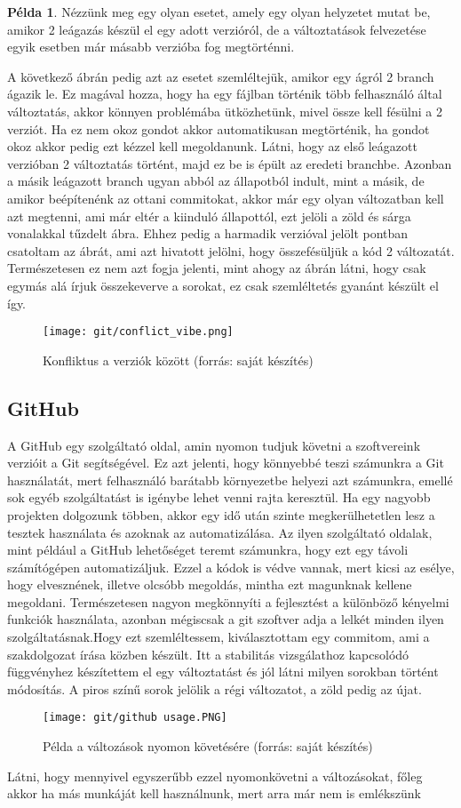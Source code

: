 \documentclass{article}
\theoremstyle{definition}
\theoremstyle{theorem}
\newtheorem{example}{Példa}
\begin{document}
\begin{example}
Nézzünk meg egy olyan esetet, amely egy olyan helyzetet mutat be, amikor 2 leágazás készül el egy adott verzióról, de a változtatások felvezetése egyik esetben már másabb verzióba fog megtörténni.
\end{example}
A következő ábrán pedig azt az esetet szemléltejük, amikor egy ágról 2 branch ágazik le. Ez magával hozza, hogy ha egy fájlban történik több felhasználó által változtatás, akkor könnyen problémába ütközhetünk, mivel össze kell fésülni a 2 verziót. Ha ez nem okoz gondot akkor automatikusan megtörténik, ha gondot okoz akkor pedig ezt kézzel kell megoldanunk. Látni, hogy az első leágazott verzióban 2 változtatás történt, majd ez be is épült az eredeti branchbe. Azonban a másik leágazott branch ugyan abból az állapotból indult, mint a másik, de amikor beépítenénk az ottani commitokat, akkor már egy olyan változatban kell azt megtenni, ami már eltér a kiinduló állapottól, ezt jelöli a zöld és sárga vonalakkal tűzdelt ábra.
Ehhez pedig a harmadik verzióval jelölt pontban csatoltam az ábrát, ami azt hivatott jelölni, hogy összefésüljük a kód 2 változatát. Természetesen ez nem azt fogja jelenti, mint ahogy az ábrán látni, hogy csak egymás alá írjuk összekeverve a sorokat, ez csak szemléltetés gyanánt készült el így.
\begin{figure}[H]
    \centering
    \texttt{[image: git/conflict\_vibe.png]}
    \caption{Konfliktus a verziók között (forrás: saját készítés)}
    \label{van_konflikt}
\end{figure}
\subsection{GitHub}
A GitHub\cite{github} egy szolgáltató oldal, amin nyomon tudjuk követni a szoftvereink verzióit a Git segítségével. Ez azt jelenti, hogy könnyebbé teszi számunkra a Git használatát, mert felhasználó barátabb környezetbe helyezi azt számunkra, emellé sok egyéb szolgáltatást is igénybe lehet venni rajta keresztül. Ha egy nagyobb projekten dolgozunk többen, akkor egy idő után szinte megkerülhetetlen lesz a tesztek használata és azoknak az automatizálása. Az ilyen szolgáltató oldalak, mint például a GitHub lehetőséget teremt számunkra, hogy ezt egy távoli számítógépen automatizáljuk. Ezzel a kódok is védve vannak, mert kicsi az esélye, hogy elvesznének, illetve olcsóbb megoldás, mintha ezt magunknak kellene megoldani. Természetesen nagyon megkönnyíti a fejlesztést a különböző kényelmi funkciók használata, azonban mégiscsak a git szoftver adja a lelkét minden ilyen szolgáltatásnak.Hogy ezt szemléltessem, kiválasztottam egy commitom, ami a szakdolgozat írása közben készült. Itt a stabilitás vizsgálathoz kapcsolódó függvényhez készítettem el egy változtatást és jól látni milyen sorokban történt módosítás. A piros színű sorok jelölik a régi változatot, a zöld pedig  az újat.
\begin{figure}[H]
    \centering
    \texttt{[image: git/github usage.PNG]}
    \caption{Példa a változások nyomon követésére (forrás: saját készítés)}
    \label{github_pelda}
\end{figure}
Látni, hogy mennyivel egyszerűbb ezzel nyomonkövetni a változásokat, főleg akkor ha más munkáját kell használnunk, mert arra már nem is emlékszünk
\end{document}
